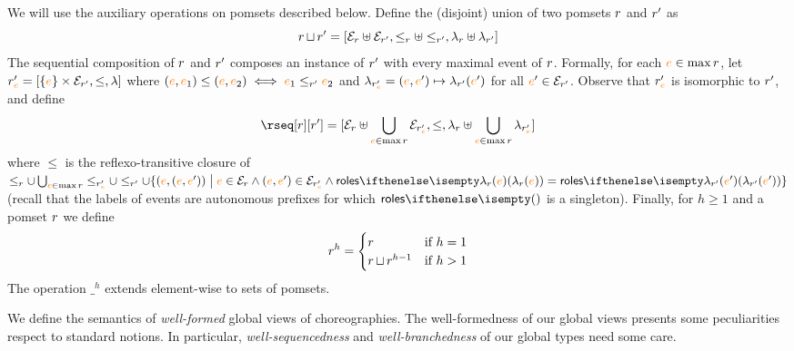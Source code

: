 %
We will use the auxiliary operations on pomsets described below.
%
Define the (disjoint) union of two pomsets $r$ and $r'$ as
\[
  r \operatorname{\sqcup} r' =
  [\mathcal{E}_{r} \uplus \mathcal{E}_{r'},
  \leq_{r} \uplus \leq_{r'},
  \lambda_{r} \uplus \lambda_{r'}]
\]
The sequential composition of $r$ and $r'$ composes an
instance of $r'$ with every maximal event of $r$.
%
Formally, for each ${\color{orange}{e}} \in \max r$, let
$r'_{{\color{orange}{e}}} = [\{{\color{orange}{e}}\} \times \mathcal{E}_{r'}, \leq, \lambda]$ where
$({\color{orange}{e}},{\color{orange}{e}}_1) \leq ({\color{orange}{e}},{\color{orange}{e}}_2) \iff {\color{orange}{e}}_1 \leq_{r'} {\color{orange}{e}}_2$ and
$\lambda_{r'_{{\color{orange}{e}}}} = ({\color{orange}{e}},{\color{orange}{e}}') \mapsto \lambda_{r'}({\color{orange}{e}}')$ for
all ${\color{orange}{e}}' \in \mathcal{E}_{r'}$.
%
Observe that $r'_{{\color{orange}{e}}}$ is isomorphic to $r'$, and define
\[
  \rseq[\apom][\apom'] = 
  [\esetof{\apom} \uplus \bigcup_{\ae \in \max \apom}\esetof{\apom'_{\ae}},
  \leq,
  \alfof{\apom} \uplus \bigcup_{\ae \in \max \apom}\alfof{\apom'_{\ae}}]
\]
where $\leq$ is the reflexo-transitive closure of
$\leqof{\apom} \cup \bigcup_{\ae \in \max \apom}\leqof{\apom'_{\ae}}
\cup \leqof{\apom'} \cup \{(\ae,(\ae,\ae')) \sst \ae \in
\esetof{\apom} \land (\ae,\ae') \in \esetof{\apom'_{\ae}} \land
\roles{\alfof{\apom}(\ae)} = \roles{\alfof{\apom'}(\ae')}\}$ (recall
that the labels of events are autonomous prefixes for which
$\roles{}$ is a singleton).
%
%
Finally, for $h \geq 1$ and a pomset $r$ we define
\[
  r^h =
  \begin{cases}
    r & \text{if } h = 1
    \\
    r \operatorname{\sqcup} r^{h-1} & \text{if } h > 1
  \end{cases}
\]
The operation $\_^h$ extends element-wise to sets of pomsets.

We define the semantics of \emph{well-formed} global views of
choreographies.
%
The well-formedness of our global views presents some peculiarities
respect to standard notions.
%
In particular, \emph{well-sequencedness} and \emph{well-branchedness}
of our global types need some care.

